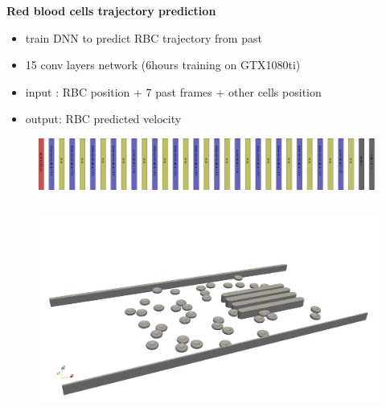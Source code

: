 \documentclass[xcolor=dvipsnames]{beamer}
\begin{document}
\begin{frame}{\bf Red blood cells trajectory prediction}

\begin{itemize}
  \item train DNN to predict RBC trajectory from past
  \item 15 conv layers network (6hours training on GTX1080ti)
  \item input : RBC position + 7 past frames + other cells position
  \item output: RBC predicted velocity
\end{itemize}

\begin{figure}
  \includegraphics[scale=0.08]{../../diagrams/rbc_net_6_cnn_architecture.png}
\end{figure}


\begin{columns}

    \begin{column}{0.5\textwidth}
    \begin{figure}
      \includegraphics[scale=0.12]{../../pictures/rbc_channel.png}
    \end{figure}
    \end{column}



\end{columns}
\end{frame}
\end{document}
